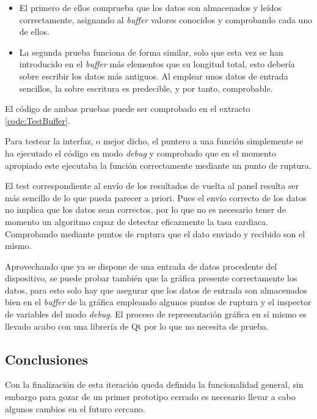         \begin{itemize}
            \item El primero de ellos comprueba que los datos son almacenados y leídos correctamente, asignando al \textit{buffer} valores conocidos y comprobando cada uno de ellos. 
            \item La segunda prueba funciona de forma similar, solo que esta vez se han introducido en el \textit{buffer} más elementos que su longitud total, esto debería sobre escribir los datos más antiguos. Al emplear unos datos de entrada sencillos, la sobre escritura es predecible, y por tanto, comprobable.
        \end{itemize}
        
         El código de ambas pruebas puede ser comprobado en el extracto \ref{code:TestBuffer}.

        Para testear la interfaz, o mejor dicho, el puntero a una función simplemente se ha ejecutado el código en modo \textit{debug} y comprobado que en el momento apropiado este ejecutaba la función correctamente mediante un punto de ruptura. 

        El test correspondiente al envío de los resultados de vuelta al panel resulta ser más sencillo de lo que pueda parecer a priori. Pues el envío correcto de los datos no implica que los datos sean correctos, por lo que no es necesario tener de momento un algoritmo capaz de detectar eficazmente la tasa cardiaca. Comprobando mediante puntos de ruptura que el dato enviado y recibido son el mismo. 
        
        Aprovechando que ya se dispone de una entrada de datos procedente del dispositivo, se puede probar también que la gráfica presente correctamente los datos, para esto solo hay que asegurar que los datos de entrada son almacenados bien en el \textit{buffer} de la gráfica empleando algunos puntos de ruptura y el inspector de variables del modo \textit{debug}. El proceso de representación gráfica en sí mismo es llevado acabo con una librería de Qt por lo que no necesita de prueba.
        

        
    \subsection{Conclusiones}
    
        Con la finalización de esta iteración queda definida la funcionalidad general, sin embargo para gozar de un primer prototipo cerrado es necesario llevar a cabo algunos cambios en el futuro cercano.
        
